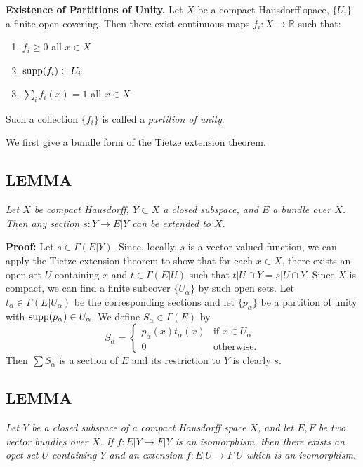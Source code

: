 \textbf{Existence of Partitions of Unity.} Let $X$ be a compact Hausdorff space, $\{U_i\}$ a finite open covering. Then there exist continuous maps $f_i : X \to \mathbb{R}$ such that:
\begin{enumerate}
    \item $f_i \geq 0$ \qquad all $x \in X$
    \item $\operatorname{supp} (f_i) \subset U_i$
    \item $\sum_i f_i(x) = 1$ \qquad all $x \in X$
\end{enumerate}

Such a collection $\{f_i\}$ is called a \textit{partition of unity}. \par
We first give a bundle form of the Tietze extension theorem. \par

\subsection{LEMMA} \textit{Let $X$ be compact Hausdorff, $Y \subset X$ a closed subspace, and $E$ a bundle over $X$. Then any section $s: Y \to E \vert Y$ can be extended to $X$.} \par 

\textbf{Proof:} Let $s \in \Gamma(E \vert Y)$. Since, locally, $s$ is a vector-valued function, we can apply the Tietze extension theorem to show that for each $x \in X$, there exists an open set $U$ containing $x$ and $t \in \Gamma(E \vert U)$ such that $t \vert U \cap Y = s \vert U \cap Y$. Since $X$ is compact, we can find a finite subcover $\{U_\alpha \}$ by such open sets. Let $t_\alpha \in \Gamma(E \vert U_\alpha)$ be the corresponding sections and let $\{p_\alpha\}$ be a partition of unity with $\operatorname{supp}(p_\alpha) \in U_\alpha$. We define $S_\alpha \in \Gamma(E)$ by
\begin{equation}
S_\alpha =
    \begin{cases}
    p_\alpha(x) t_\alpha(x) & \text{if $x \in U_\alpha$} \\
    0 & \text{otherwise.}\end{cases}
\end{equation}
Then $\sum S_\alpha$ is a section of $E$ and its restriction to $Y$ is clearly $s$.

\subsection{LEMMA}\label{lem:1.4.2} \textit{Let $Y$ be a closed subspace of a compact Hausdorff space $X$, and let $E, F$ be two vector bundles over $X$. If $f: E \vert Y \to F \vert Y$ is an isomorphism, then there exists an opet set $U$ containing $Y$ and an extension $f: E \vert U \to F \vert U$ which is an isomorphism.} \par 

